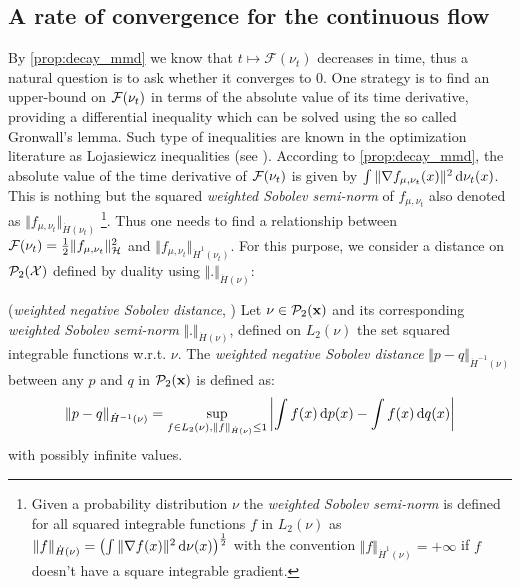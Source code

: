 \subsection{A rate of convergence for the continuous flow}\label{sec:Lojasiewicz_inequality}
By \cref{prop:decay_mmd} we know that $t\mapsto\mathcal{F}(\nu_t)$ decreases in time, thus a natural question is to ask whether it converges to $0$. One strategy is to find an upper-bound on ${{\mathcal F}}(\nu_t)$ in terms of the absolute value of its time derivative, providing a differential inequality which can be solved using the so called Gronwall's lemma. Such type of inequalities are known in the optimization literature as Lojasiewicz inequalities (see \cite{Bolte:2016}).
According to \cref{prop:decay_mmd}, the absolute value of the time derivative of ${{\mathcal F}}(\nu_t)$ is given by $\int \Vert \nabla f_{\mu,\nu_t}(x) \Vert^2 \mathop{}\!\mathrm{d} \nu_t(x)$. This is nothing but the squared \textit{weighted Sobolev semi-norm} of $f_{\mu,\nu_t}$ also denoted as $\Vert f_{\mu,\nu_t} \Vert_{\dot{H}(\nu_t)}$ \footnote{Given a probability distribution $\nu$ the \textit{weighted Sobolev semi-norm} is defined for all squared integrable functions $f$ in $L_2(\nu)$ as $ \Vert f \Vert_{\dot{H}(\nu)} = \left(\int \Vert \nabla f(x) \Vert^2 \mathop{}\!\mathrm{d} \nu(x) \right)^{\frac{1}{2}}$ with the convention $\Vert f \Vert_{\dot{H}^1(\nu)} = +\infty$ if $f$ doesn't have a square integrable gradient.}. Thus one needs to find a relationship between ${{\mathcal F}}(\nu_t) = \frac{1}{2} \Vert f_{\mu,\nu_t} \Vert_{\mathcal{H}}^2 $ and $\Vert f_{\mu,\nu_t} \Vert_{\dot{H}^1(\nu_t)}$. For this purpose, we consider a distance on $\mathcal{P}_2({{\mathcal X}})$ defined by duality using $\Vert . \Vert_{\dot{H}(\nu)}$:
\begin{definition}\label{def:neg_sobolev}(\textit{weighted negative Sobolev distance}, \cite{Peyre:2011})
	Let $\nu\in \mathcal{P}_2({\mathbf x})$ and its corresponding \textit{weighted Sobolev semi-norm} $ \Vert . \Vert_{\dot{H}(\nu)} $, defined on $L_2(\nu)$ the set squared integrable functions w.r.t. $\nu$. The \textit{weighted negative Sobolev distance} $\Vert p - q \Vert_{\dot{H}^{-1}(\nu)}$ between any $p$ and $q$ in $\mathcal{P}_2({\mathbf x})$  is defined as:
\begin{align}\label{eq:neg_sobolev}
	\Vert p - q \Vert_{\dot{H}^{-1}(\nu)} = \sup_{f\in L_2(\nu), \Vert f \Vert_{\dot{H}(\nu)} \leq 1 } \left\vert \int f(x)\mathop{}\!\mathrm{d} p(x) - \int f(x)\mathop{}\!\mathrm{d} q(x) \right\vert 
\end{align}	
with possibly infinite values.
\end{definition}
